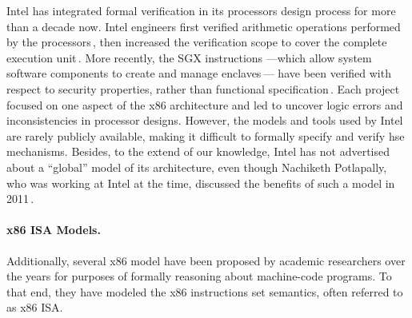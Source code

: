 Intel has integrated formal verification in its processors design process for
more than a decade now.
%
Intel engineers first verified arithmetic operations performed by the
processors\,\cite{harrison2000x86}, then increased the verification scope to
cover the complete execution unit\,\cite{kaivola2009formalintel}.
%
More recently, the SGX instructions ---which allow system software components to
create and manage enclaves\,\cite{costan2016sgxexplained}--- have been verified
with respect to security properties, rather than functional
specification\,\cite{leslie2015linsgx}.
%
Each project focused on one aspect of the x86 architecture and led to uncover
logic errors and inconsistencies in processor designs.
%
However, the models and tools used by Intel are rarely publicly available,
making it difficult to formally specify and verify \ac{hse}
mechanisms. 
%
Besides, to the extend of our knowledge, Intel has not advertised about a
``global'' model of its architecture, even though Nachiketh Potlapally, who was
working at Intel at the time, discussed the benefits of such a model in
2011\,\cite{potlapally2011hardwaresecurity}. 

\paragraph{x86 ISA Models.}
%
Additionally, several x86 model have been proposed by academic researchers over
the years for purposes of formally reasoning about machine-code programs.
%
To that end, they have modeled the x86 instructions set semantics, often
referred to as x86 ISA.

